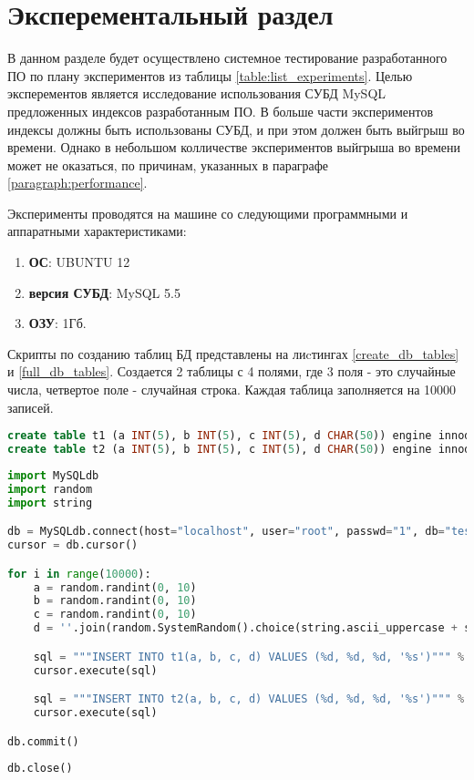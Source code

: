 \chapter{Эксперементальный раздел}

В данном разделе будет осуществлено системное тестирование разработанного ПО по плану экспериментов из таблицы \ref{table:list_experiments}. Целью эксперементов является исследование использования СУБД MySQL предложенных индексов разработанным ПО. В больше части экспериментов индексы должны быть использованы СУБД, и при этом должен быть выйгрыш во времени. Однако в небольшом колличестве экспериментов выйгрыша во времени может не оказаться, по причинам, указанных в параграфе \ref{paragraph:performance}. 

Эксперименты проводятся на машине со следующими программными и аппаратными характеристиками:
\begin{enumerate}
\item \textbf{ОС}: UBUNTU 12
\item \textbf{версия СУБД}: MySQL 5.5
\item \textbf{ОЗУ}: 1Гб.
\end{enumerate}

Скрипты по созданию таблиц БД представлены на лиcтингах \ref{create_db_tables} и \ref{full_db_tables}. Создается 2 таблицы с 4 полями, где 3 поля - это случайные числа, четвертое поле - случайная строка. Каждая таблица заполняется на 10000 записей.

\begin{lstlisting}[language=sql, caption={Создание таблиц БД},label=create_db_tables]
create table t1 (a INT(5), b INT(5), c INT(5), d CHAR(50)) engine innodb;
create table t2 (a INT(5), b INT(5), c INT(5), d CHAR(50)) engine innodb;
\end{lstlisting}

\begin{lstlisting}[language=python, caption={Наполнение таблиц БД},label=full_db_tables]
import MySQLdb
import random
import string

db = MySQLdb.connect(host="localhost", user="root", passwd="1", db="test", charset='utf8')
cursor = db.cursor()

for i in range(10000):
    a = random.randint(0, 10)
    b = random.randint(0, 10)
    c = random.randint(0, 10)
    d = ''.join(random.SystemRandom().choice(string.ascii_uppercase + string.digits) for _ in range(30))

    sql = """INSERT INTO t1(a, b, c, d) VALUES (%d, %d, %d, '%s')""" % (a, b, c, d)
    cursor.execute(sql)

    sql = """INSERT INTO t2(a, b, c, d) VALUES (%d, %d, %d, '%s')""" % (a, b, c, d)
    cursor.execute(sql)

db.commit()
 
db.close()
\end{lstlisting}


